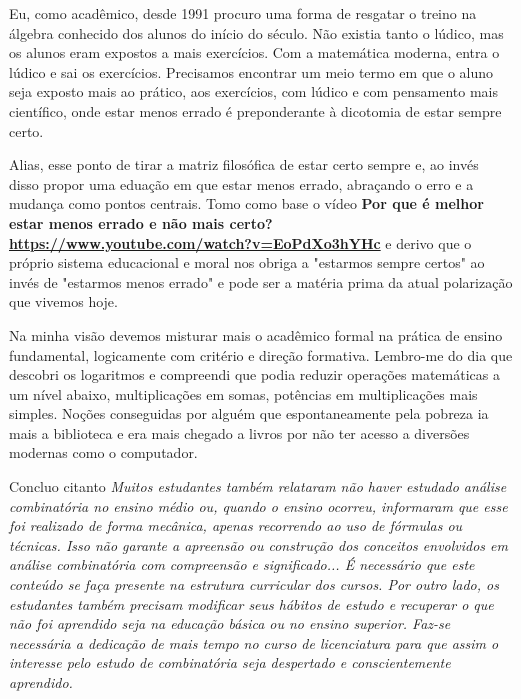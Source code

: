\documentclass[
	12pt,				%
	openright,			%
	oneside,
	a4paper,			%
	chapter=TITLE,		%
	section=TITLE,		%
	sumario=abnt-6027-2012,
	english,			%
	brazil				%
]{abntex2}
\begin{document}
	Eu, como acadêmico, desde 1991 procuro uma forma de resgatar o treino na álgebra conhecido dos alunos do início do século. Não existia tanto o lúdico, mas os alunos eram expostos a mais exercícios. Com a matemática moderna, entra o lúdico e sai os exercícios. Precisamos encontrar um meio termo em que o aluno seja exposto mais ao prático, aos exercícios, com lúdico e com pensamento mais científico, onde estar menos errado é preponderante à dicotomia de estar sempre certo.
	
	Alias, esse ponto de tirar a matriz filosófica de estar certo sempre e, ao invés disso propor uma eduação em que estar menos errado, abraçando o erro e a mudança como pontos centrais. Tomo como base o vídeo \textbf{Por que é melhor estar menos errado e não mais certo? \url{https://www.youtube.com/watch?v=EoPdXo3hYHc} } e derivo que o próprio sistema educacional e moral nos obriga a "estarmos sempre certos" ao invés de "estarmos menos errado" e pode ser a matéria prima da atual polarização que vivemos hoje.
	
	
	Na minha visão devemos misturar mais o acadêmico formal na prática de ensino fundamental, logicamente com critério e direção formativa. Lembro-me do dia que descobri os logaritmos e compreendi que podia reduzir operações matemáticas a um nível abaixo, multiplicações em somas, potências em multiplicações mais simples. Noções conseguidas por alguém que espontaneamente pela pobreza ia mais a biblioteca e era mais chegado a livros por não ter acesso a diversões modernas como o computador.
	
	Concluo citanto \cite{SantosWagner2013} \textit{Muitos estudantes também relataram não haver estudado análise combinatória no ensino médio ou, quando o ensino ocorreu, informaram que esse foi realizado de forma mecânica, apenas recorrendo ao uso de fórmulas ou técnicas. Isso não garante a apreensão ou construção dos conceitos envolvidos em análise combinatória com compreensão e significado... É necessário que este conteúdo se faça presente na estrutura curricular dos cursos. Por outro lado, os estudantes também precisam modificar seus hábitos de estudo e recuperar o que não foi aprendido seja na educação básica ou no ensino superior. Faz-se necessária a dedicação de mais tempo no curso de licenciatura para que assim o interesse pelo estudo de combinatória seja despertado e conscientemente aprendido.}
	





\label{oculto:bibliografia}
\end{document}
